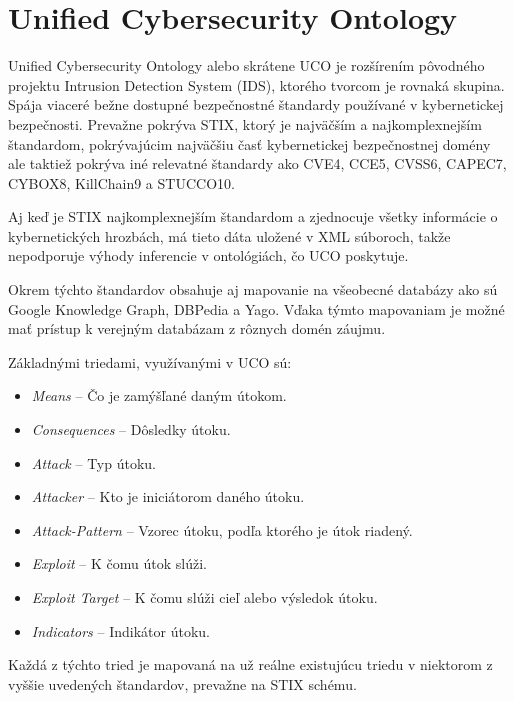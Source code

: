 \documentclass[12pt, a4paper, oneside]{book}
\begin{document}




\section{Unified Cybersecurity Ontology}
Unified Cybersecurity Ontology \citep{SyedPFMJ16} alebo skrátene UCO je rozšírením pôvodného projektu Intrusion Detection System (IDS), ktorého tvorcom je rovnaká skupina. Spája viaceré bežne dostupné bezpečnostné štandardy používané v kybernetickej bezpečnosti. Prevažne pokrýva STIX, ktorý je najväčším a najkomplexnejším štandardom, pokrývajúcim najväčšiu časť kybernetickej bezpečnostnej domény ale taktiež pokrýva iné relevatné štandardy ako CVE4, CCE5, CVSS6, CAPEC7, CYBOX8, KillChain9 a STUCCO10.


Aj keď je STIX najkomplexnejším štandardom a zjednocuje všetky informácie o kybernetických hrozbách, má tieto dáta uložené v XML súboroch, takže nepodporuje výhody inferencie v ontológiách, čo UCO poskytuje.


Okrem týchto štandardov obsahuje aj mapovanie na všeobecné databázy ako sú Google Knowledge Graph, DBPedia a Yago. Vďaka týmto mapovaniam je možné mať prístup k verejným databázam z rôznych domén záujmu.


Základnými triedami, využívanými v UCO sú: 
\begin{itemize}
\item \textit{Means} -- Čo je zamýšľané daným útokom.
\item \textit{Consequences} -- Dôsledky útoku.
\item \textit{Attack} -- Typ útoku.
\item \textit{Attacker} -- Kto je iniciátorom daného útoku.
\item \textit{Attack-Pattern} -- Vzorec útoku, podľa ktorého je útok riadený.
\item \textit{Exploit} -- K čomu útok slúži.
\item \textit{Exploit Target} -- K čomu slúži cieľ alebo výsledok útoku.
\item \textit{Indicators} -- Indikátor útoku.
\end{itemize}
Každá z týchto tried je mapovaná na už reálne existujúcu triedu v niektorom z vyššie uvedených štandardov, prevažne na STIX schému.
\end{document}
